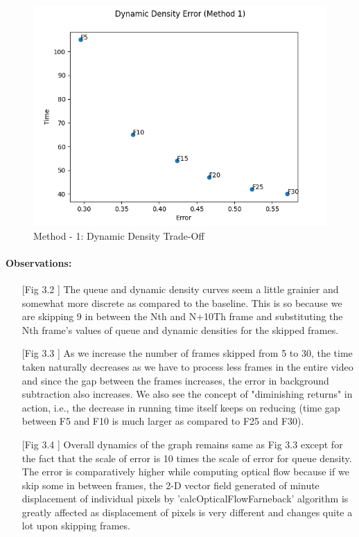 \documentclass[paper=a4, fontsize = 12pt]{scrartcl}
\numberwithin{equation}{section}		%
\numberwithin{figure}{section}			%
\numberwithin{table}{section}				%
\begin{document}
\begin{figure}[H]
    \centering
    \captionsetup{justification=centering,margin=2cm}
    \includegraphics[width = 15cm]{method1_tradeoff_dynamic.png}
    \caption{Method - 1: Dynamic Density Trade-Off}
    \label{fig:M1DynamicTradeOff}
\end{figure}

\paragraph{Observations:}
\begin{itemize}
    \item [[Fig 3.2]] The queue and dynamic density curves seem a little grainier and somewhat more discrete as compared to the baseline. This is so because we are skipping 9 in between the Nth and N+10Th frame and substituting the Nth frame's values of queue and dynamic densities for the skipped frames.
    
    \item [[Fig 3.3]] As we increase the number of frames skipped from 5 to 30, the time taken naturally decreases as we have to process less frames in the entire video and since the gap between the frames increases, the error in background subtraction also increases. We also see the concept of "diminishing returns" in action, i.e., the decrease in running time itself keeps on reducing (time gap between F5 and F10 is much larger as compared to F25 and F30). 
    
    \item [[Fig 3.4]] Overall dynamics of the graph remains same as Fig 3.3 except for the fact that the scale of error is 10 times the scale of error for queue density. The error is comparatively higher while computing optical flow because if we skip some in between frames, the 2-D vector field generated of minute displacement of individual pixels by 'calcOpticalFlowFarneback' algorithm is greatly affected as displacement of pixels is very different and changes quite a lot upon skipping frames.
\end{itemize}
\end{document}
